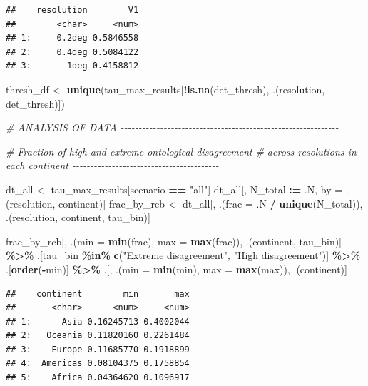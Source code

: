 \documentclass[
  11pt,
]{article}
\newenvironment{Shaded}{\begin{snugshade}}{\end{snugshade}}
\newcommand{\AttributeTok}[1]{\textcolor[rgb]{0.13,0.29,0.53}{#1}}
\newcommand{\CommentTok}[1]{\textcolor[rgb]{0.56,0.35,0.01}{\textit{#1}}}
\newcommand{\FunctionTok}[1]{\textcolor[rgb]{0.13,0.29,0.53}{\textbf{#1}}}
\newcommand{\NormalTok}[1]{#1}
\newcommand{\OtherTok}[1]{\textcolor[rgb]{0.56,0.35,0.01}{#1}}
\newcommand{\SpecialCharTok}[1]{\textcolor[rgb]{0.81,0.36,0.00}{\textbf{#1}}}
\newcommand{\StringTok}[1]{\textcolor[rgb]{0.31,0.60,0.02}{#1}}
\begin{document}
\begin{verbatim}
##    resolution        V1
##        <char>     <num>
## 1:     0.2deg 0.5846558
## 2:     0.4deg 0.5084122
## 3:       1deg 0.4158812
\end{verbatim}

\begin{Shaded}
\begin{Highlighting}[]
\NormalTok{thresh\_df }\OtherTok{\textless{}{-}} \FunctionTok{unique}\NormalTok{(tau\_max\_results[}\SpecialCharTok{!}\FunctionTok{is.na}\NormalTok{(det\_thresh), .(resolution, det\_thresh)])}

\CommentTok{\# ANALYSIS OF DATA {-}{-}{-}{-}{-}{-}{-}{-}{-}{-}{-}{-}{-}{-}{-}{-}{-}{-}{-}{-}{-}{-}{-}{-}{-}{-}{-}{-}{-}{-}{-}{-}{-}{-}{-}{-}{-}{-}{-}{-}{-}{-}{-}{-}{-}{-}{-}{-}{-}{-}{-}{-}{-}{-}{-}{-}{-}{-}{-}{-}{-}}

\CommentTok{\# Fraction of high and extreme ontological disagreement}
\CommentTok{\# across resolutions in each continent {-}{-}{-}{-}{-}{-}{-}{-}{-}{-}{-}{-}{-}{-}{-}{-}{-}{-}{-}{-}{-}{-}{-}{-}{-}{-}{-}{-}{-}{-}{-}{-}{-}{-}{-}{-}{-}{-}{-}{-}{-}}

\NormalTok{dt\_all }\OtherTok{\textless{}{-}}\NormalTok{ tau\_max\_results[scenario }\SpecialCharTok{==} \StringTok{"all"}\NormalTok{]}
\NormalTok{dt\_all[, N\_total }\SpecialCharTok{:=}\NormalTok{ .N, by }\OtherTok{=}\NormalTok{ .(resolution, continent)]}
\NormalTok{frac\_by\_rcb }\OtherTok{\textless{}{-}}\NormalTok{ dt\_all[, .(}\AttributeTok{frac =}\NormalTok{ .N }\SpecialCharTok{/} \FunctionTok{unique}\NormalTok{(N\_total)), }
\NormalTok{                      .(resolution, continent, tau\_bin)]}

\NormalTok{frac\_by\_rcb[, .(}\AttributeTok{min =} \FunctionTok{min}\NormalTok{(frac), }\AttributeTok{max =} \FunctionTok{max}\NormalTok{(frac)), .(continent, tau\_bin)] }\SpecialCharTok{\%\textgreater{}\%}
\NormalTok{  .[tau\_bin }\SpecialCharTok{\%in\%} \FunctionTok{c}\NormalTok{(}\StringTok{"Extreme disagreement"}\NormalTok{, }\StringTok{"High disagreement"}\NormalTok{)] }\SpecialCharTok{\%\textgreater{}\%}
\NormalTok{  .[}\FunctionTok{order}\NormalTok{(}\SpecialCharTok{{-}}\NormalTok{min)] }\SpecialCharTok{\%\textgreater{}\%}
\NormalTok{  .[, .(}\AttributeTok{min =} \FunctionTok{min}\NormalTok{(min), }\AttributeTok{max =} \FunctionTok{max}\NormalTok{(max)), .(continent)]}
\end{Highlighting}
\end{Shaded}

\begin{verbatim}
##    continent        min       max
##       <char>      <num>     <num>
## 1:      Asia 0.16245713 0.4002044
## 2:   Oceania 0.11820160 0.2261484
## 3:    Europe 0.11685770 0.1918899
## 4:  Americas 0.08104375 0.1758854
## 5:    Africa 0.04364620 0.1096917
\end{verbatim}
\end{document}
